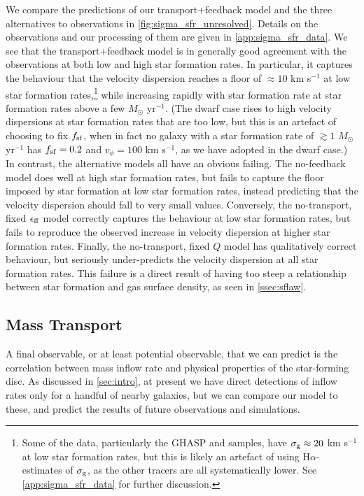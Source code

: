 \documentclass[useAMS,usenatbib]{mn2e}
\begin{document}
We compare the predictions of our transport+feedback model and the three alternatives to observations in \autoref{fig:sigma_sfr_unresolved}. Details on the observations and our processing of them are given in \autoref{app:sigma_sfr_data}. We see that the transport+feedback model is in generally good agreement with the observations at both low and high star formation rates. In particular, it captures the behaviour that the velocity dispersion reaches a floor of $\approx 10$ km s$^{-1}$ at low star formation rates,\footnote{Some of the data, particularly the GHASP and \citet{moiseev15a} samples, have $\sigma_{\rm g} \approx 20$ km s$^{-1}$ at low star formation rates, but this is likely an artefact of using H$\alpha$-estimates of $\sigma_{\rm g}$, as the other tracers are all systematically lower. See \autoref{app:sigma_sfr_data} for further discussion.} while increasing rapidly with star formation rate at star formation rates above a few $M_\odot$ yr$^{-1}$. (The dwarf case rises to high velocity dispersions at star formation rates that are too low, but this is an artefact of choosing to fix $f_{\rm sf}$, when in fact no galaxy with a star formation rate of $\gtrsim 1$ $M_\odot$ yr$^{-1}$ has $f_{\rm sf} = 0.2$ and $v_\phi = 100$ km s$^{-1}$, as we have adopted in the dwarf case.) In contrast, the alternative models all have an obvious failing. The no-feedback model does well at high star formation rates, but fails to capture the floor imposed by star formation at low star formation rates, instead predicting that the velocity dispersion should fall to very small values. Conversely, the no-transport, fixed $\epsilon_{\rm ff}$ model correctly captures the behaviour at low star formation rates, but fails to reproduce the observed increase in velocity dispersion at higher star formation rates. Finally, the no-transport, fixed $Q$ model has qualitatively correct behaviour, but seriously under-predicts the velocity dispersion at all star formation rates. This failure is a direct result of having too steep a relationship between star formation and gas surface density, as seen in \autoref{ssec:sflaw}.


\subsection{Mass Transport}
\label{ssec:obs_transport}

A final observable, or at least potential observable, that we can predict is the correlation between mass inflow rate and physical properties of the star-forming disc. As discussed in \autoref{sec:intro}, at present we have direct detections of inflow rates only for a handful of nearby galaxies, but we can compare our model to these, and predict the results of future observations and simulations.
\end{document}
